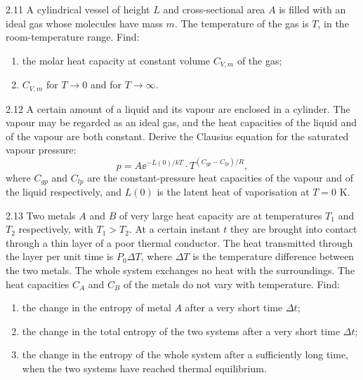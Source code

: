 \begin{problem}{2.11}
A cylindrical vessel of height $L$ and cross-sectional area $A$ is filled with an ideal gas whose molecules have mass $m$. The temperature of the gas is $T$, in the room-temperature range. Find:
\begin{enumerate}[label=(\arabic*),leftmargin=2.2em,itemsep=1pt,topsep=2pt]
\item the molar heat capacity at constant volume $C_{V,m}$ of the gas;
\item $C_{V,m}$ for $T\to0$ and for $T\to\infty$.
\end{enumerate}
\end{problem}

\begin{problem}{2.12}
A certain amount of a liquid and its vapour are enclosed in a cylinder. The vapour may be regarded as an ideal gas, and the heat capacities of the liquid and of the vapour are both constant. Derive the Clausius equation for the saturated vapour pressure:
\[
p = A\ee^{-L(0)/kT}\cdot T^{(C_{gp}-C_{lp})/R},
\]
where $C_{gp}$ and $C_{lp}$ are the constant-pressure heat capacities of the vapour and of the liquid respectively, and $L(0)$ is the latent heat of vaporisation at $T = 0$ K.
\end{problem}

\begin{problem}{2.13}
Two metals $A$ and $B$ of very large heat capacity are at temperatures $T_1$ and $T_2$ respectively, with $T_1 > T_2$. At a certain instant $t$ they are brought into contact through a thin layer of a poor thermal conductor. The heat transmitted through the layer per unit time is $P_0\Delta T$, where $\Delta T$ is the temperature difference between the two metals. The whole system exchanges no heat with the surroundings. The heat capacities $C_A$ and $C_B$ of the metals do not vary with temperature. Find:
\begin{enumerate}[label=(\arabic*),leftmargin=2.2em,itemsep=1pt,topsep=2pt]
\item the change in the entropy of metal $A$ after a very short time $\Delta t$;
\item the change in the total entropy of the two systems after a very short time $\Delta t$;
\item the change in the entropy of the whole system after a sufficiently long time, when the two systems have reached thermal equilibrium.
\end{enumerate}
\end{problem}

